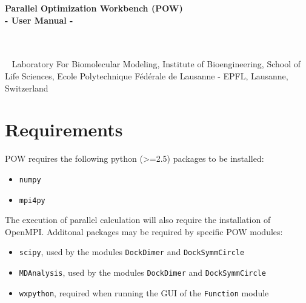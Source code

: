 \documentclass[a4paper, 12pt]{article}
\begin{document}
\begin{titlepage}
\begin{center}

{\huge \bfseries
Parallel Optimization Workbench (POW)\\
- User Manual -\\}
\ \\
\ \\
\vspace{3cm}

\footnotesize{\ }
\vfill %
%
{\large Laboratory For Biomolecular Modeling, Institute of Bioengineering, School of Life Sciences, Ecole Polytechnique F\'ed\'erale de Lausanne - EPFL, Lausanne, Switzerland}
%
\end{center}
\end{titlepage}


\pagebreak

\pagestyle{plain}
\parindent=0in

\tableofcontents

\pagebreak


\section{Requirements}

POW requires the following python (>=2.5) packages to be installed:
\begin{itemize}
\item \texttt{numpy}
\item \texttt{mpi4py}
\end{itemize}

The execution of parallel calculation will also require the installation of OpenMPI. Additonal packages may be required by specific POW modules:

\begin{itemize}
\item \texttt{scipy}, used by the modules \texttt{DockDimer} and \texttt{DockSymmCircle}
\item \texttt{MDAnalysis}, used by the modules \texttt{DockDimer} and \texttt{DockSymmCircle}
\item \texttt{wxpython}, required when running the GUI of the \texttt{Function} module 
\end{itemize}
\end{document}
